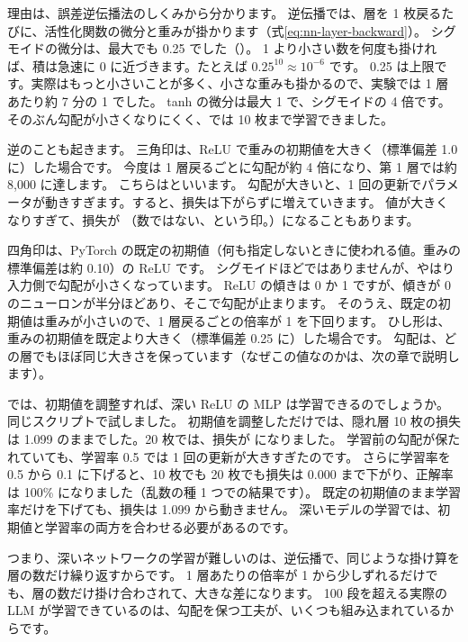 理由は、誤差逆伝播法のしくみから分かります。
逆伝播では、層を 1 枚戻るたびに、活性化関数の微分と重みが掛かります（式\eqref{eq:nn-layer-backward}）。
シグモイドの微分は、最大でも 0.25 でした（）。
1 より小さい数を何度も掛ければ、積は急速に 0 に近づきます。たとえば $0.25^{10}\approx10^{-6}$ です。
0.25 は上限です。実際はもっと小さいことが多く、小さな重みも掛かるので、実験では 1 層あたり約 7 分の 1 でした。
tanh の微分は最大 1 で、シグモイドの 4 倍です。
そのぶん勾配が小さくなりにくく、では 10 枚まで学習できました。

逆のことも起きます。
三角印は、ReLU で重みの初期値を大きく（標準偏差 1.0 に）した場合です。
今度は 1 層戻るごとに勾配が約 4 倍になり、第 1 層では約 8,000 に達します。
こちらはといいます。
勾配が大きいと、1 回の更新でパラメータが動きすぎます。すると、損失は下がらずに増えていきます。
値が大きくなりすぎて、損失が （数ではない、という印。）になることもあります。

四角印は、PyTorch の既定の初期値（何も指定しないときに使われる値。重みの標準偏差は約 0.10）の ReLU です。
シグモイドほどではありませんが、やはり入力側で勾配が小さくなっています。
ReLU の傾きは 0 か 1 ですが、傾きが 0 のニューロンが半分ほどあり、そこで勾配が止まります。
そのうえ、既定の初期値は重みが小さいので、1 層戻るごとの倍率が 1 を下回ります。
ひし形は、重みの初期値を既定より大きく（標準偏差 0.25 に）した場合です。
勾配は、どの層でもほぼ同じ大きさを保っています（なぜこの値なのかは、次の章で説明します）。

では、初期値を調整すれば、深い ReLU の MLP は学習できるのでしょうか。同じスクリプトで試しました。
初期値を調整しただけでは、隠れ層 10 枚の損失は 1.099 のままでした。20 枚では、損失が  になりました。
学習前の勾配が保たれていても、学習率 0.5 では 1 回の更新が大きすぎたのです。
さらに学習率を 0.5 から 0.1 に下げると、10 枚でも 20 枚でも損失は 0.000 まで下がり、正解率は 100\% になりました（乱数の種 1 つでの結果です）。
既定の初期値のまま学習率だけを下げても、損失は 1.099 から動きません。
深いモデルの学習では、初期値と学習率の両方を合わせる必要があるのです。

つまり、深いネットワークの学習が難しいのは、逆伝播で、同じような掛け算を層の数だけ繰り返すからです\cite{glorot2010understanding}。
1 層あたりの倍率が 1 から少しずれるだけでも、層の数だけ掛け合わされて、大きな差になります。
100 段を超える実際の LLM が学習できているのは、勾配を保つ工夫が、いくつも組み込まれているからです。

